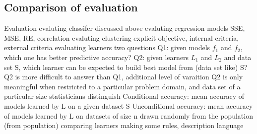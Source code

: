 \subsection{Comparison of evaluation}
\begin{outline}
    \1 Evaluation
        \2 evaluting classifer
            \3 discussed above
        \2 evaluting regression models
            \3 SSE, MSE, RE, correlation
        \2 evaluting clustering
            \3 explicit objective, internal criteria, external criteria
        \2 evaluating learners
            \3 two questions
                \4 Q1: given models $f_{1}$ and $f_{2}$, which one has better predictive accuracy?
                \4 Q2: given learners $L_{1}$ and $L_{2}$ and data set S, which learner can be expected to build best model from (data set like) S?
            \3 Q2 is more difficult to answer than Q1, additional level of varaition
            \3 Q2 is only meaningful when restricted to a particular problem domain, and data set of a particular size
            \3 statisticians distinguish
                \4 Conditional accuracy: mean accuracy of models learned by L on a given dataset S
                \4 Unconditional accuracy: mean accuracy of models learned by L on datasets of size n drawn randomly from the population (from population)
            \3 comparing learners
                \4 making some rules, description language
\end{outline}

\pagebreak